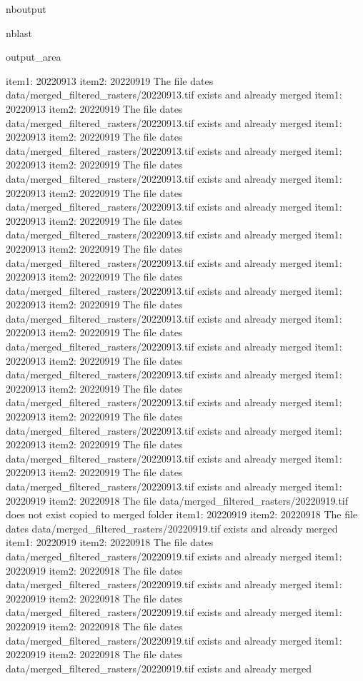 \documentclass[letterpaper,10pt]{sphinxmanual}
\begin{document}
\begin{sphinxuseclass}{nboutput}
\begin{sphinxuseclass}{nblast}
{\begin{sphinxuseclass}{output_area}
\begin{sphinxuseclass}{}
\begin{sphinxVerbatim}[commandchars=\\\{\}]
item1:  20220913
item2:  20220919
The file dates data/merged\_filtered\_rasters/20220913.tif exists and already merged
item1:  20220913
item2:  20220919
The file dates data/merged\_filtered\_rasters/20220913.tif exists and already merged
item1:  20220913
item2:  20220919
The file dates data/merged\_filtered\_rasters/20220913.tif exists and already merged
item1:  20220913
item2:  20220919
The file dates data/merged\_filtered\_rasters/20220913.tif exists and already merged
item1:  20220913
item2:  20220919
The file dates data/merged\_filtered\_rasters/20220913.tif exists and already merged
item1:  20220913
item2:  20220919
The file dates data/merged\_filtered\_rasters/20220913.tif exists and already merged
item1:  20220913
item2:  20220919
The file dates data/merged\_filtered\_rasters/20220913.tif exists and already merged
item1:  20220913
item2:  20220919
The file dates data/merged\_filtered\_rasters/20220913.tif exists and already merged
item1:  20220913
item2:  20220919
The file dates data/merged\_filtered\_rasters/20220913.tif exists and already merged
item1:  20220913
item2:  20220919
The file dates data/merged\_filtered\_rasters/20220913.tif exists and already merged
item1:  20220913
item2:  20220919
The file dates data/merged\_filtered\_rasters/20220913.tif exists and already merged
item1:  20220913
item2:  20220919
The file dates data/merged\_filtered\_rasters/20220913.tif exists and already merged
item1:  20220913
item2:  20220919
The file dates data/merged\_filtered\_rasters/20220913.tif exists and already merged
item1:  20220913
item2:  20220919
The file dates data/merged\_filtered\_rasters/20220913.tif exists and already merged
item1:  20220913
item2:  20220919
The file dates data/merged\_filtered\_rasters/20220913.tif exists and already merged
item1:  20220919
item2:  20220918
The file data/merged\_filtered\_rasters/20220919.tif does not exist copied to merged folder
item1:  20220919
item2:  20220918
The file dates data/merged\_filtered\_rasters/20220919.tif exists and already merged
item1:  20220919
item2:  20220918
The file dates data/merged\_filtered\_rasters/20220919.tif exists and already merged
item1:  20220919
item2:  20220918
The file dates data/merged\_filtered\_rasters/20220919.tif exists and already merged
item1:  20220919
item2:  20220918
The file dates data/merged\_filtered\_rasters/20220919.tif exists and already merged
item1:  20220919
item2:  20220918
The file dates data/merged\_filtered\_rasters/20220919.tif exists and already merged
item1:  20220919
item2:  20220918
The file dates data/merged\_filtered\_rasters/20220919.tif exists and already merged

\end{sphinxVerbatim}
\end{sphinxuseclass}
\end{sphinxuseclass}}
\end{sphinxuseclass}
\end{sphinxuseclass}
\end{document}
